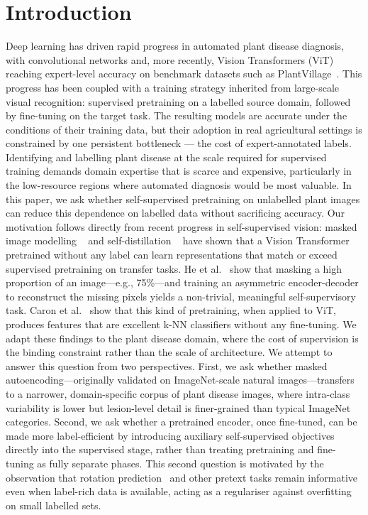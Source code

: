 \documentclass[conference]{IEEEtran}
\begin{document}
\section{Introduction}

Deep learning has driven rapid progress in automated plant disease diagnosis, with convolutional networks and, more recently, Vision Transformers (ViT)~\cite{3} reaching expert-level accuracy on benchmark datasets such as PlantVillage~\cite{2}. This progress has been coupled with a training strategy inherited from large-scale visual recognition: supervised pretraining on a labelled source domain, followed by fine-tuning on the target task. The resulting models are accurate under the conditions of their training data, but their adoption in real agricultural settings is constrained by one persistent bottleneck — the cost of expert-annotated labels. Identifying and labelling plant disease at the scale required for supervised training demands domain expertise that is scarce and expensive, particularly in the low-resource regions where automated diagnosis would be most valuable.
In this paper, we ask whether self-supervised pretraining on unlabelled plant images can reduce this dependence on labelled data without sacrificing accuracy. Our motivation follows directly from recent progress in self-supervised vision: masked image modelling ~\cite{1,9} and self-distillation ~\cite{7} have shown that a Vision Transformer pretrained without any label can learn representations that match or exceed supervised pretraining on transfer tasks. He et al.~\cite{1} show that masking a high proportion of an image—e.g., 75\%—and training an asymmetric encoder-decoder to reconstruct the missing pixels yields a non-trivial, meaningful self-supervisory task. Caron et al.~\cite{7} show that this kind of pretraining, when applied to ViT, produces features that are excellent k-NN classifiers without any fine-tuning. We adapt these findings to the plant disease domain, where the cost of supervision is the binding constraint rather than the scale of architecture.
We attempt to answer this question from two perspectives. First, we ask whether masked autoencoding—originally validated on ImageNet-scale natural images—transfers to a narrower, domain-specific corpus of plant disease images, where intra-class variability is lower but lesion-level detail is finer-grained than typical ImageNet categories. Second, we ask whether a pretrained encoder, once fine-tuned, can be made more label-efficient by introducing auxiliary self-supervised objectives directly into the supervised stage, rather than treating pretraining and fine-tuning as fully separate phases. This second question is motivated by the observation that rotation prediction~\cite{10} and other pretext tasks remain informative even when label-rich data is available, acting as a regulariser against overfitting on small labelled sets.
\end{document}

